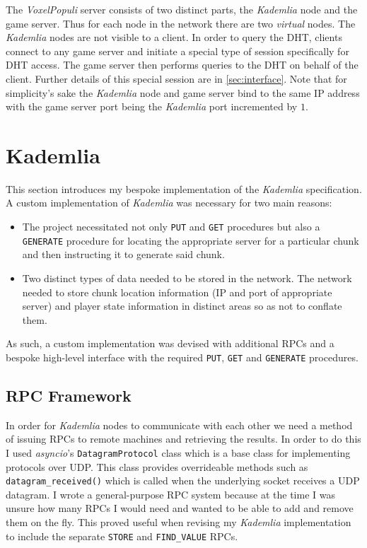 \documentclass[12pt,notitlepage,a4paper]{report}
\newcommand{\kademlia}{\emph{Kademlia}}
\newcommand{\voxpop}{\emph{VoxelPopuli}}
\begin{document}
	The \voxpop{} server consists of two distinct parts, the \kademlia{} node and the game server. Thus for each node in the network there are two \emph{virtual} nodes. The \kademlia{} nodes are not visible to a client. In order to query the DHT, clients connect to any game server and initiate a special type of session specifically for DHT access. The game server then performs queries to the DHT on behalf of the client. Further details of this special session are in \cref{sec:interface}. Note that for simplicity's sake the \kademlia{} node and game server bind to the same IP address with the game server port being the \kademlia{} port incremented by $1$.
	
	\section{Kademlia}
	This section introduces my bespoke implementation of the \kademlia{} specification. A custom implementation of \kademlia{} was necessary for two main reasons:
	\begin{itemize}
		\item The project necessitated not only \texttt{PUT} and \texttt{GET} procedures but also a \texttt{GENERATE} procedure for locating the appropriate server for a particular chunk and then instructing it to generate said chunk.
		\item Two distinct types of data needed to be stored in the network. The network needed to store chunk location information (IP and port of appropriate server) and player state information in distinct areas so as not to conflate them.
	\end{itemize}
	As such, a custom implementation was devised with additional RPCs and a bespoke high-level interface with the required \texttt{PUT}, \texttt{GET} and \texttt{GENERATE} procedures.
	
	\subsection{RPC Framework}
	\label{sec:rpcframework}
	In order for \kademlia{} nodes to communicate with each other we need a method of issuing RPCs to remote machines and retrieving the results. In order to do this I used \emph{asyncio}'s \texttt{DatagramProtocol} class which is a base class for implementing protocols over UDP. This class provides overrideable methods such as \texttt{datagram\_received()} which is called when the underlying socket receives a UDP datagram. I wrote a general-purpose RPC system because at the time I was unsure how many RPCs I would need and wanted to be able to add and remove them on the fly. This proved useful when revising my \kademlia{} implementation to include the separate \texttt{STORE} and \texttt{FIND\_VALUE} RPCs.
	
\end{document}
